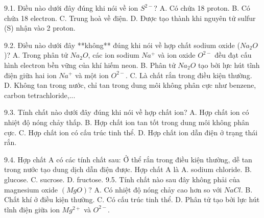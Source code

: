 9.1. Điều nào dưới đây đúng khi nói về ion $S^{2-}$?
A. Có chứa 18 proton.
B. Có chứa 18 electron.
C. Trung hoà về điện.
D. Được tạo thành khi nguyên tử sulfur (S) nhận vào 2 proton.

9.2. Điều nào dưới đây **không** đúng khi nói về hợp chất sodium oxide ($Na_2O$)?
A. Trong phân tử $Na_2O$, các ion sodium $Na^+$ và ion oxide $O^{2-}$ đều đạt cấu hình electron bền vững của khí hiếm neon.
B. Phân tử $Na_2O$ tạo bởi lực hút tĩnh điện giữa hai ion $Na^+$ và một ion $O^{2-}$.
C. Là chất rắn trong điều kiện thường.
D. Không tan trong nước, chỉ tan trong dung môi không phân cực như benzene, carbon tetrachloride,...

9.3. Tính chất nào dưới đây đúng khi nói về hợp chất ion?
A. Hợp chất ion có nhiệt độ nóng chảy thấp.
B. Hợp chất ion tan tốt trong dung môi không phân cực.
C. Hợp chất ion có cấu trúc tinh thể.
D. Hợp chất ion dẫn điện ở trạng thái rắn.

9.4. Hợp chất A có các tính chất sau: Ở thể rắn trong điều kiện thường, dễ tan trong nước tạo dung dịch dẫn điện được. Hợp chất A là
A. sodium chloride.
B. glucose.
C. sucrose.
D. fructose.
9.5. Tính chất nào sau đây không phải của magnesium oxide $(MgO)$?
A. Có nhiệt độ nóng chảy cao hơn so với $NaCl$.
B. Chất khí ở điều kiện thường.
C. Có cấu trúc tinh thể.
D. Phân tử tạo bởi lực hút tĩnh điện giữa ion $Mg^{2+}$ và $O^{2-}$.

